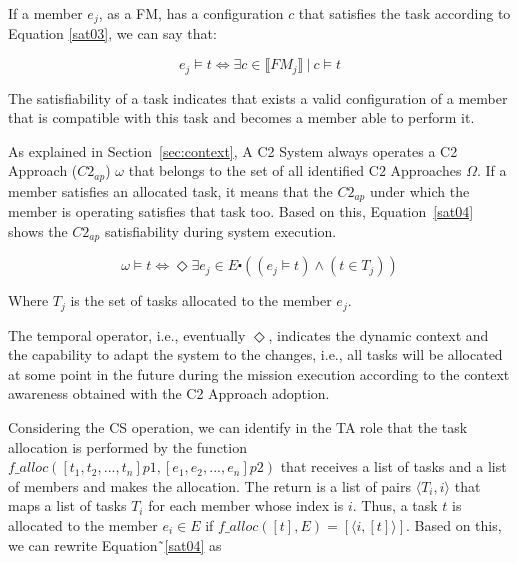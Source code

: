 

If a member $e_j$, as a FM, has a configuration $c$ that satisfies the task according to Equation \ref{sat03}, we can say that:

\begin{center}
\begin{equation}
\label{sat02}
e_j \models t \Longleftrightarrow \exists c \in \llbracket FM_j \rrbracket \ | \ c \models t
\end{equation}
\end{center}

The satisfiability of a task indicates that exists a valid configuration of a member that is compatible with this task and becomes a member able to perform it. 

As explained in Section~\ref{sec:context}, A C2 System always operates a C2 Approach ($C2_{ap}$) $\omega$ that belongs to the set of all identified C2 Approaches $\Omega$. If a member satisfies an allocated task, it means that the $C2_{ap}$ under which the member is operating satisfies that task too. Based on this, Equation~\ref{sat04} shows the $C2_{ap}$ satisfiability during system execution.

\begin{center}
\begin{equation}
\label{sat04}
\omega \models t \Longleftrightarrow  \Diamond \exists e_j \in E \centerdot  ((e_j \models t) \land (t \in T_j))
\end{equation}
\end{center}

Where $T_j$ is the set of tasks allocated to the member $e_j$.

The temporal operator, i.e., eventually $\Diamond$, indicates the dynamic context and the capability to adapt the system to the changes, i.e., all tasks will be allocated at some point in the future during the mission execution according to the context awareness obtained with the C2 Approach adoption.

Considering the CS operation, we can identify in the TA role that the task allocation is performed by the function $f\_alloc([t_1, t_2, ..., t_n] p1, [e_1, e_2, ..., e_n] p2)$ that receives a list of tasks and a list of members and makes the allocation. The return is a list of pairs $\langle T_i, i \rangle$ that maps a list of tasks $T_i$ for each member whose index is $i$. Thus, a task $t$ is allocated to the member $e_i \in E$ if $f\_alloc([t],E)=[\langle i, [t] \rangle]$. Based on this, we can rewrite Equation˜\ref{sat04} as

